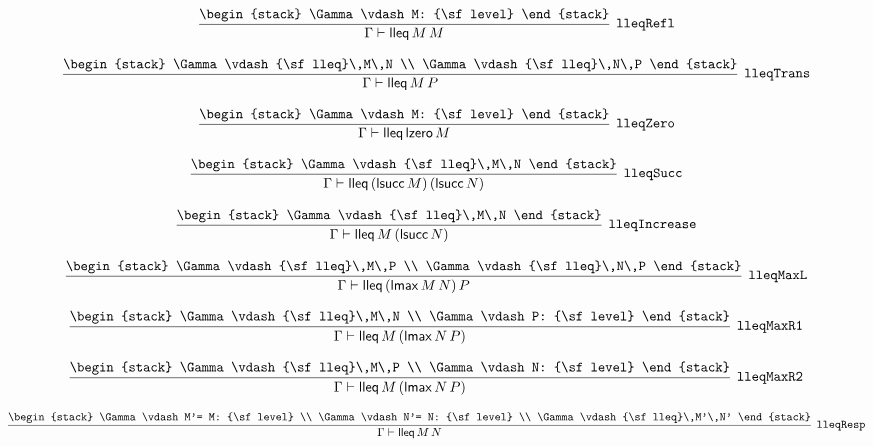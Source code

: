 \[
\infer[{\tt lleqRefl}]{\Gamma \vdash {\sf lleq}\,M\,M}{
\begin{stack}
\Gamma \vdash M: {\sf level}
\end{stack}}
\]

\[
\infer[{\tt lleqTrans}]{\Gamma \vdash {\sf lleq}\,M\,P}{
\begin{stack}
\Gamma \vdash {\sf lleq}\,M\,N
\\
\Gamma \vdash {\sf lleq}\,N\,P
\end{stack}}
\]

\[
\infer[{\tt lleqZero}]{\Gamma \vdash {\sf lleq}\,{\sf lzero}\,M}{
\begin{stack}
\Gamma \vdash M: {\sf level}
\end{stack}}
\]

\[
\infer[{\tt lleqSucc}]{\Gamma \vdash {\sf lleq}\,({\sf lsucc}\,M)\,({\sf lsucc}\,N)}{
\begin{stack}
\Gamma \vdash {\sf lleq}\,M\,N
\end{stack}}
\]

\[
\infer[{\tt lleqIncrease}]{\Gamma \vdash {\sf lleq}\,M\,({\sf lsucc}\,N)}{
\begin{stack}
\Gamma \vdash {\sf lleq}\,M\,N
\end{stack}}
\]

\[
\infer[{\tt lleqMaxL}]{\Gamma \vdash {\sf lleq}\,({\sf lmax}\,M\,N)\,P}{
\begin{stack}
\Gamma \vdash {\sf lleq}\,M\,P
\\
\Gamma \vdash {\sf lleq}\,N\,P
\end{stack}}
\]

\[
\infer[{\tt lleqMaxR1}]{\Gamma \vdash {\sf lleq}\,M\,({\sf lmax}\,N\,P)}{
\begin{stack}
\Gamma \vdash {\sf lleq}\,M\,N
\\
\Gamma \vdash P: {\sf level}
\end{stack}}
\]

\[
\infer[{\tt lleqMaxR2}]{\Gamma \vdash {\sf lleq}\,M\,({\sf lmax}\,N\,P)}{
\begin{stack}
\Gamma \vdash {\sf lleq}\,M\,P
\\
\Gamma \vdash N: {\sf level}
\end{stack}}
\]

\[
\infer[{\tt lleqResp}]{\Gamma \vdash {\sf lleq}\,M\,N}{
\begin{stack}
\Gamma \vdash M'= M: {\sf level}
\\
\Gamma \vdash N'= N: {\sf level}
\\
\Gamma \vdash {\sf lleq}\,M'\,N'
\end{stack}}
\]

